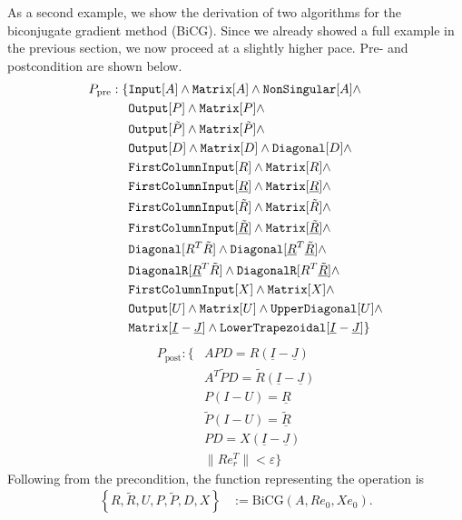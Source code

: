 As a second example, we show the derivation of two algorithms for the biconjugate gradient method (BiCG). Since we already showed a full example in the previous section, we now proceed at a slightly higher pace. Pre- and postcondition are shown below.
%
\begin{align*}
P_\text{pre}: \{ &\text{\ttfamily Input}[A] \land \text{\ttfamily Matrix}[A] \land \text{\ttfamily NonSingular}[A] \land \\
		&\text{\ttfamily Output}[P] \land \text{\ttfamily Matrix}[P] \land \\
		&\text{\ttfamily Output}[\tilde{P}] \land \text{\ttfamily Matrix}[\tilde{P}] \land \\
		&\text{\ttfamily Output}[D] \land \text{\ttfamily Matrix}[D] \land \text{\ttfamily Diagonal}[D] \land \\
		&\text{\ttfamily FirstColumnInput}[R] \land \text{\ttfamily Matrix}[R] \land \\
		&\text{\ttfamily FirstColumnInput}[\underline{R}] \land \text{\ttfamily Matrix}[\underline{R}]  \land \\
		&\text{\ttfamily FirstColumnInput}[\tilde{R}] \land \text{\ttfamily Matrix}[\tilde{R}] \land  \\
		&\text{\ttfamily FirstColumnInput}[\underline{\tilde{R}}] \land \text{\ttfamily Matrix}[\underline{\tilde{R}}] \land \\
		&\text{\ttfamily Diagonal}[R^T \tilde{R}] \land \text{\ttfamily Diagonal}[\underline{R}^T \underline{\tilde{R}}] \land \\
		&\text{\ttfamily DiagonalR}[\underline{R}^T \tilde{R}] \land \text{\ttfamily DiagonalR}[R^T \underline{\tilde{R}}] \land \\
		&\text{\ttfamily FirstColumnInput}[X] \land \text{\ttfamily Matrix}[X] \land \\
		&\text{\ttfamily Output}[U] \land \text{\ttfamily Matrix}[U] \land \text{\ttfamily UpperDiagonal}[U] \land \\
		& \text{\ttfamily Matrix}[\underline{I} - \underline{J}] \land \text{\ttfamily LowerTrapezoidal}[\underline{I} - \underline{J}] \}
\end{align*}
%
\begin{align*}
P_\text{post}:	\{ 	&APD = R \left( \underline{I} - \underline{J} \right) \\
				&A^T \tilde{P}D = \tilde{R} \left( \underline{I} - \underline{J} \right) \\
				&P \left( I - U \right) = \underline{R} \\
				&\tilde{P} \left( I - U \right) = \underline{\tilde{R}} \\
				&PD = X \left( \underline{I} - \underline{J} \right) \\
				&\| R e_r^T \| < \varepsilon \}
\end{align*}
%
Following from the precondition, the function representing the operation is
%
\begin{align*}
\left\{ R, \tilde{R}, U, P, \tilde{P}, D, X \right\} &:= \text{BiCG} \left(A, R e_0, X e_0 \right) \text{.}
\end{align*}
%

